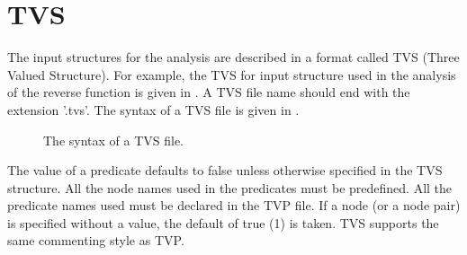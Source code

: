 \section{TVS}

The input structures for the analysis are described in a format
called TVS (Three Valued Structure). For example, the TVS for
input structure used in the analysis of the reverse function is
given in . A TVS file name should end with
the extension '.tvs'. The syntax of a TVS file is given in
.

\begin{figure}
 \caption{\label{Fi:TVSSyntax}The syntax of a TVS file.}
\end{figure}

The value of a predicate defaults to false unless otherwise
specified in the TVS structure. All the node names used in the
predicates must be predefined. All the predicate names used must
be declared in the TVP file. If a node (or a node pair) is
specified without a value, the default of true (1) is taken. TVS
supports the same commenting style as TVP.
